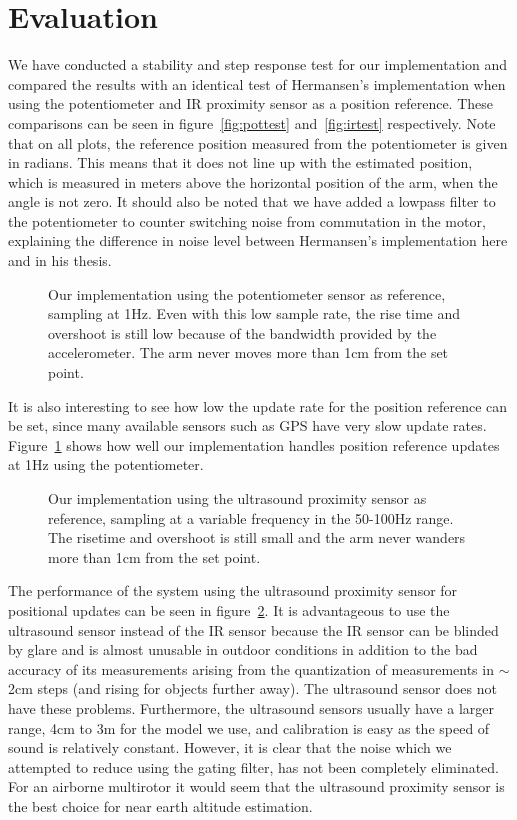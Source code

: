\section{Evaluation}\label{sec:evaluation}
We have conducted a stability and step response test for our implementation and compared the results with an identical test of
Hermansen's implementation when using the potentiometer and IR proximity sensor as a position reference. These comparisons can be
seen in figure~\ref{fig:pottest} and~\ref{fig:irtest} respectively. Note that on all plots, the reference position measured from the
potentiometer is given in radians. This means that it does not line up with the estimated position, which is measured in meters above
the horizontal position of the arm, when the angle is not zero. It should also be noted that we have added a lowpass filter to the
potentiometer to counter switching noise from commutation in the motor,
explaining the difference in noise level between Hermansen's implementation here and in his thesis.
\begin{figure}
	\setlength\figureheight{4cm}
	\setlength\figurewidth{6cm}
	
	\caption{Our implementation using the potentiometer sensor as reference, sampling at 1Hz. Even with this low sample rate, the
		rise time and overshoot is still low because of the bandwidth provided by the accelerometer. The arm never moves more than
		1cm from the set point.}
\label{fig:pot1hztest}
\end{figure}

It is also interesting to see how low the update rate for the position reference can be set, since many available sensors such as GPS 
have very slow update rates. Figure~\ref{fig:pot1hztest} shows how well our implementation handles position reference updates at
1Hz using the potentiometer.
\begin{figure}
	\setlength\figureheight{4cm}
	\setlength\figurewidth{6cm}
	
	\caption{Our implementation using the ultrasound proximity sensor as reference, sampling at a variable frequency in the 50-100Hz 
	range. The risetime and overshoot is still small and the arm never wanders more than 1cm from the set point.}
\label{fig:ultratest}
\end{figure}


The performance of the system using the ultrasound proximity sensor for positional updates can be seen in figure~\ref{fig:ultratest}.
It is advantageous to use the ultrasound sensor instead of the IR sensor because the IR sensor can be blinded by glare and is almost
unusable in outdoor conditions in addition to the bad accuracy of its measurements arising from the quantization of measurements in
\(\sim\)2cm steps (and rising for objects further away). The ultrasound sensor
does not have these problems. Furthermore, the ultrasound sensors usually have a
larger range, 4cm to 3m for the model we use, and calibration is easy as the
speed of sound is relatively constant. However, it is clear that the noise
which we attempted to reduce using the gating filter, has not been completely eliminated.
For an airborne multirotor it would seem that the ultrasound proximity sensor is the best choice for near earth altitude estimation.
